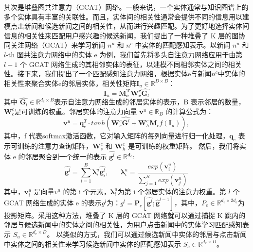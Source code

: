 \documentclass[withoutpreface,bwprint]{cumcmthesis} %
\begin{document}
	其次是堆叠图共注意力（GCAT）网络。一般来说，一个实体通常与知识图谱上的多个实体具有丰富的关联性。而且，实体间的相关性通常会提供不同的信息用以建模点击新闻和候选新闻之间的相关性，从而进行兴趣匹配。为了更好地选择实体间信息的相关性来匹配用户感兴趣的候选新闻，我们提出了一种堆叠了 K 层的图协同关注网络（GCAT）来学习新闻 $ {n}^{u}$ 和 ${n} ^ {c} $ 中实体的匹配感知表示。以新闻 $ {n}^{u} $ 和 $l$-th 图共注意力网络中的实体 e 为例，我们首先将多头自注意力网络应用于由第 $l-1$ 个 GCAT 网络生成的其相邻实体的表征，以建模不同相邻实体之间的相关性。接下来，我们提出了一个匹配感知注意力网络，根据实体e与新闻${n}^{c}$中实体的相关性来聚合实体e的邻居实体，相关性矩阵$ \mathbf{I}_u \in \mathbb{R}^{D \times B} $：
	\begin{equation}
	\mathbf{I}_u = \mathbf{M^T_c} \mathbf{W^c_c} \hat{\mathbf{G}_l}
	\end{equation}
	其中 $\hat{\mathbf{G}_l} \in \mathbb{R}^{d_e \times
	B}$表示自注意力网络生成的邻居实体的表示，B 表示邻居的数量，$\mathbf{W}^c_c$是可训练的权重。邻居实体的注意力向量 $\mathbf{v}^{u} \in \mathbb{R}_B $ 的计算公式为：
	\begin{equation}
	\mathbf{v}^{u} = \mathbf{q}^T_e \cdot tanh(\mathbf{W}^c_s \hat{\mathbf{G}^{l}} + \mathbf{W}^c_h \mathbf{M}_c f(\mathbf{I}_u) ), 
	\end{equation}
	其中，f 代表softmax激活函数，它对输入矩阵的每列向量进行归一化处理，$\mathbf{q}_e$ 表示可训练的注意力查询矩阵，$\mathbf{W}^c_s$ 和 $\mathbf{W}^c_h$ 是可训练的权重矩阵。
	然后，我们将实体 e 的邻居聚合到一个统一的表示 $\hat{\mathbf{g}^{l}} \in \mathbb{R}^{\mathbf{d}_e}  $:
	\begin{equation}
	\hat{\mathbf{g}^{l}} = \sum_{i=1}^{B}\mathbf{\lambda}^u_i\hat{\mathbf{g}^l_i},{~~~~~~~~}      
	\mathbf{\lambda}^u_i = \frac{exp(\mathbf{v}^u_i)}{\sum_{j=1}^{B}exp(\mathbf{v}^u_j)}
	\end{equation}
	其中，$\mathbf{v}^u_i$ 是向量$v^u$ 的第 i 个元素，$\mathbf{\lambda}^u_i$为第 i 个邻居实体的注意力权重。第 $l$ 个 GCAT 网络生成的实体 e 的表示$g^l$为：$g^l = \mathbf{P}_e[\hat{\mathbf{g}^{l}};\hat{\mathbf{g}}^{l-1}]$，其中，$P_e\in \mathbb{R}^{d_e\times2d_e}$为投影矩阵。采用这种方法，堆叠了 K 层的 GCAT 网络就可以通过捕捉 K 跳内的邻居与候选新闻中的实体之间的相关性，为用户点击新闻中的实体学习匹配感知表示 $S_u \in \mathbb{R}^{d_e \times D}$。 以类似的方式，我们可以通过候选新闻中实体的邻居与点击新闻中实体之间的相关性来学习候选新闻中实体的匹配感知表示 $S_c \in \mathbb{R}^{d_e \times D}$。
	
\end{document}
